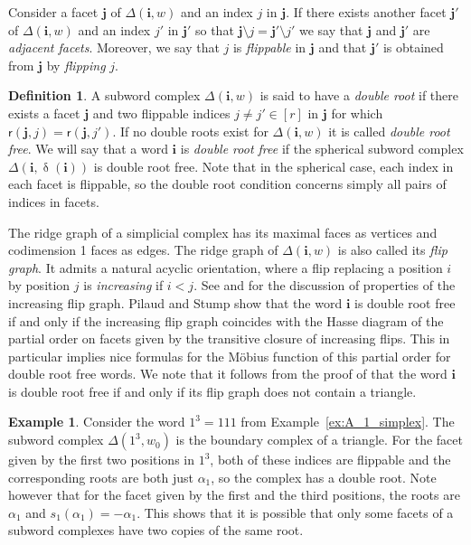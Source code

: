 \documentclass[a4paper, 11pt]{amsart}
\newcommand{\rootf}{\mathsf{r}}
\newcommand{\word}[1]{\mathbf{#1}}
\DeclareMathOperator{\dem}{\delta}
\theoremstyle{definition}
\newtheorem{definition}[theorem]{Definition}
\newtheorem{example}[theorem]{Example}
\begin{document}
Consider a facet $\word{j}$ of $\Delta(\word{i},w)$ and an index $j$ in $\word{j}$.
If there exists another facet $\word{j}'$ of $\Delta(\word{i},w)$ and an index $j'$ in $\word{j}'$ so that $\word{j}\setminus j=\word{j}'\setminus j'$ we say that $\word{j}$ and $\word{j'}$ are \emph{adjacent facets}.
Moreover, we say that $j$ is \emph{flippable} in $\word{j}$ and that $\word{j}'$ is obtained from $\word{j}$ by \emph{flipping} $j$.

\begin{definition}\label{def:double root free}
    A subword complex $\Delta(\word{i},w)$ is said to have a \emph{double root} if there exists a facet $\word{j}$ and two flippable indices $j\not=j'\in[r]$ in $\word{j}$ for which $\rootf(\word{j},j)=\rootf(\word{j},j')$.
If no double roots exist for $\Delta(\word{i},w)$ it is called \emph{double root free}.
We will say that a word $\word{i}$ is \emph{double root free} if the spherical subword complex $\Delta(\word{i}, \dem(\word{i}))$ is double root free. Note that in the spherical case, each index in each facet is flippable, so the double root condition concerns simply all pairs of indices in facets.
\end{definition}



The ridge graph of a simplicial complex has its maximal faces as vertices and codimension 1 faces as edges. The ridge graph of $\Delta(\word{i},w)$ is also called its \emph{flip graph}. 
It admits a natural acyclic orientation, where a flip replacing a position $i$ by position $j$ is \emph{increasing} if $i < j$. See \cite[Remark 4.5]{knutson_miller_04} and \cite{PilaudStump-EL} for the discussion of properties of the increasing flip graph. Pilaud and Stump show \cite[Proposition 5.1]{PilaudStump-EL} that the word $\word{i}$ is double root free if and only if the increasing flip graph coincides with the Hasse diagram of the partial order on facets given by the transitive closure of increasing flips. This in particular implies nice formulas for the Möbius function of this partial order for double root free words. We note that it follows from the proof of \cite[Proposition 5.1]{PilaudStump-EL} that the word $\word{i}$ is double root free if and only if its flip graph does not contain a triangle.

\begin{example}
Consider the word $1^3 = 111$ from Example~\ref{ex:A_1_simplex}. The subword complex $\Delta(1^3, w_0)$ is the boundary complex of a triangle. For the facet given by the first two positions in $1^3$, both of these indices are flippable and the corresponding roots are both just $\alpha_1$, so the complex has a double root. Note however that for the facet given by the first and the third positions, the roots are $\alpha_1$ and $s_1(\alpha_1) = -\alpha_1$. This shows that it is possible that only some facets of a subword complexes have two copies of the same root.
\end{example}
\end{document}
